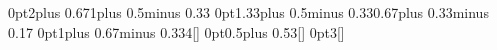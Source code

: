 \titlespacing*{\section}%
	{0pt}{2\baselineskip plus 0.67\baselineskip}{1\baselineskip plus 0.5\baselineskip minus 0.33\baselineskip}
\titlespacing*{\subsection}%
	{0pt}{1.33\baselineskip plus 0.5\baselineskip minus 0.33\baselineskip}{0.67\baselineskip plus 0.33\baselineskip minus 0.17\baselineskip}
\titlespacing{\subsubsection}%
	{0pt}{1\baselineskip plus 0.67\baselineskip minus 0.33\baselineskip}{4\wordsep}[]
\titlespacing{\paragraph}
	{0pt}{0.5\baselineskip plus 0.5\baselineskip}{3\wordsep}[]
\titlespacing{\subparagraph}
	{\parindent}{0pt}{3\wordsep}[]


\setlength{\marginparwidth}{3.75cm}
\setlength{\marginparsep}{0.4cm}
\setlength{\marginparpush}{0.4cm}






\newenvironment{abstract}{%
	\par\bigskip\bigskip\bigskip\medskip
	\begingroup%
	\noindent%
	\sffamily\fontseries{sl}\selectfont%
	\textbf{\fontseries{sb}\selectfont Abstract.}~\space%
	\ignorespaces%
}{%
	\unskip\par
	\endgroup
}